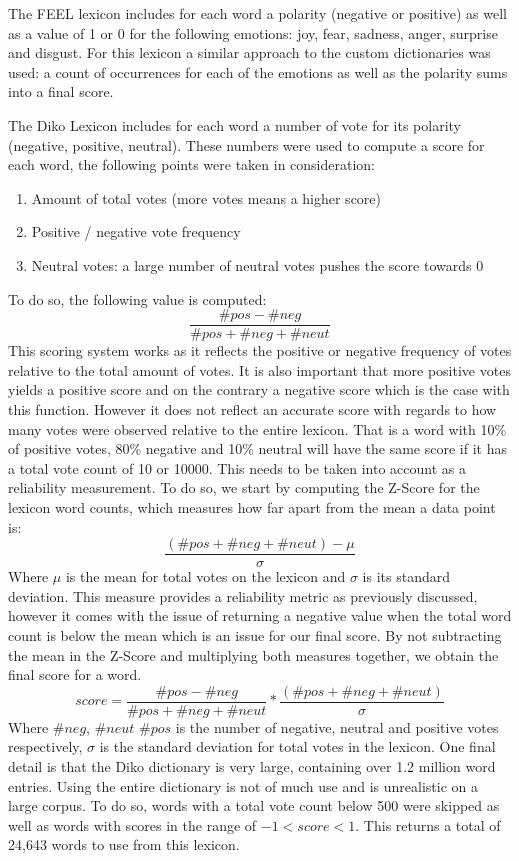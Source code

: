 The FEEL lexicon includes for each word a polarity (negative or positive) as well as a value of 1 or 0 for the following emotions: joy, fear, sadness, anger, surprise and disgust. For this lexicon a similar approach to the custom dictionaries was used: a count of occurrences for each of the emotions as well as the polarity sums into a final score.

The Diko Lexicon includes for each word a number of vote for its polarity (negative, positive, neutral). These numbers were used to compute a score for each word, the following points were taken in consideration:
\begin{enumerate}
    \item Amount of total votes (more votes means a higher score)
    \item Positive / negative vote frequency
    \item Neutral votes: a large number of neutral votes pushes the score towards 0
\end{enumerate}
To do so, the following value is computed:
\begin{equation}
    \frac{\#pos - \#neg}{\#pos + \#neg + \#neut}
\end{equation}
This scoring system works as it reflects the positive or negative frequency of votes relative to the total amount of votes. It is also important that more positive votes yields a positive score and on the contrary a negative score which is the case with this function. However it does not reflect an accurate score with regards to how many votes were observed relative to the entire lexicon. That is a word with 10\% of positive votes, 80\% negative and 10\% neutral will have the same score if it has a total vote count of 10 or 10000. This needs to be taken into account as a reliability measurement.
To do so, we start by computing the Z-Score for the lexicon word counts, which measures how far apart from the mean a data point is:
\begin{equation}
    \frac{(\#pos + \#neg + \#neut) - \mu}{\sigma}
\end{equation}
Where $\mu$ is the mean for total votes on the lexicon and $\sigma$ is its standard deviation. This measure provides a reliability metric as previously discussed, however it comes with the issue of returning a negative value when the total word count is below the mean which is an issue for our final score. By not subtracting the mean in the Z-Score and multiplying both measures together, we obtain the final score for a word.
\begin{equation}
\label{diko score}
    score = \frac{\#pos - \#neg}{\#pos + \#neg + \#neut} * \frac{(\#pos + \#neg + \#neut)}{\sigma}
\end{equation}
Where $\#neg$, $\#neut$ $\#pos$ is the number of negative, neutral and positive votes respectively, $\sigma$ is the standard deviation for total votes in the lexicon.
One final detail is that the Diko dictionary is very large, containing over 1.2 million word entries. Using the entire dictionary is not of much use and is unrealistic on a large corpus. To do so, words with a total vote count below 500 were skipped as well as words with scores in the range of $-1 < score < 1$. This returns a total of 24,643 words to use from this lexicon.

